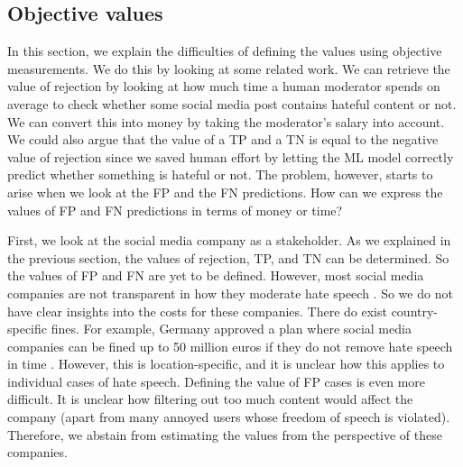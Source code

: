 \subsection{Objective values}
In this section, we explain the difficulties of defining the values using objective measurements. We do this by looking at some related work. We can retrieve the value of rejection by looking at how much time a human moderator spends on average to check whether some social media post contains hateful content or not. We can convert this into money by taking the moderator's salary into account. We could also argue that the value of a TP and a TN is equal to the negative value of rejection since we saved human effort by letting the ML model correctly predict whether something is hateful or not. The problem, however, starts to arise when we look at the FP and the FN predictions. How can we express the values of FP and FN predictions in terms of money or time?

First, we look at the social media company as a stakeholder. As we explained in the previous section, the values of rejection, TP, and TN can be determined. So the values of FP and FN are yet to be defined. However, most social media companies are not transparent in how they moderate hate speech \citep{klonick2017new}. So we do not have clear insights into the costs for these companies. There do exist country-specific fines. For example, Germany approved a plan where social media companies can be fined up to 50 million euros if they do not remove hate speech in time \citep{bbc-firms-face-fine-germany}. However, this is location-specific, and it is unclear how this applies to individual cases of hate speech. Defining the value of FP cases is even more difficult. It is unclear how filtering out too much content would affect the company (apart from many annoyed users whose freedom of speech is violated). Therefore, we abstain from estimating the values from the perspective of these companies.

